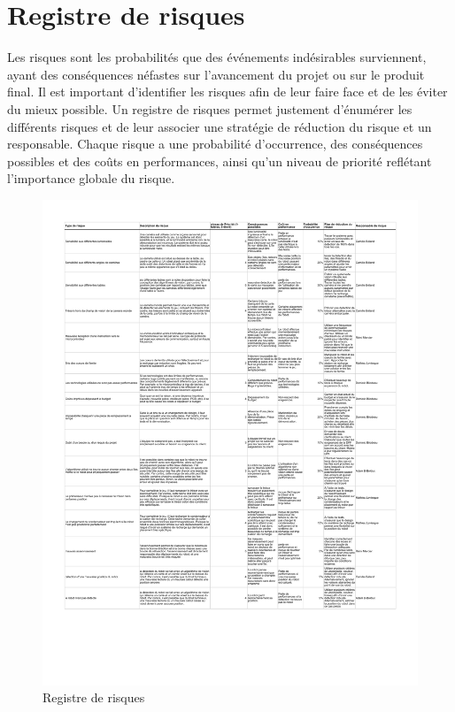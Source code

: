 \chapter{Registre de risques}

Les risques sont les probabilités que des événements indésirables surviennent, ayant des conséquences néfastes sur l'avancement du projet ou sur le produit final.
Il est important d'identifier les risques afin de leur faire face et de les éviter du mieux possible.
Un registre de risques permet justement d'énumérer les différents risques et de leur associer une stratégie de réduction du risque et un responsable.
Chaque risque a une probabilité d'occurrence, des conséquences possibles et des coûts en performances, ainsi qu'un niveau de priorité reflétant l'importance globale du risque.

\begin{figure}
  \centering
  \caption{Registre de risques}
  \includegraphics[scale=0.80, angle=0]{resources/risques.pdf}
\end{figure}
